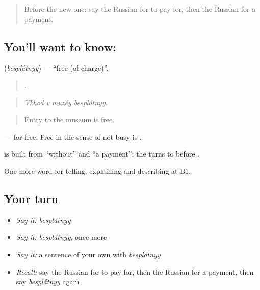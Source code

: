 \label{lesson:RU-C397-besplatnyy}



\begin{quote}
Before the new one: say the Russian for to pay for, then the Russian for a payment.
\end{quote}

\subsection*{You'll want to know: }
\textbf{} (\emph{besplátnyy}) — \textquotedblleft{}free (of charge)\textquotedblright{}.

\begin{quote}
   .
\end{quote}

\begin{quote}
\emph{Vkhod v muzéy besplátnyy.}
\end{quote}

\begin{quote}
Entry to the museum is free.
\end{quote}

\emph{} — for free. Free in the sense of not busy is \emph{}.

\begin{cousinweb}
\textbf{} is built from \emph{} \textquotedblleft{}without\textquotedblright{} and \emph{} \textquotedblleft{}a payment\textquotedblright{}; the \emph{} turns to \emph{} before \emph{}.
\end{cousinweb}

\begin{grammarlens}[title={What you've built}]
One more word for telling, explaining and describing at B1.
\end{grammarlens}

\subsection*{Your turn}
\begin{itemize}
\raggedright
  \item \emph{Say it:} \emph{besplátnyy}
  \item \emph{Say it:} \emph{besplátnyy}, once more
  \item \emph{Say it:} a sentence of your own with \emph{besplátnyy}
  \item \emph{Recall:} say the Russian for to pay for, then the Russian for a payment, then say \emph{besplátnyy} again
\end{itemize}

